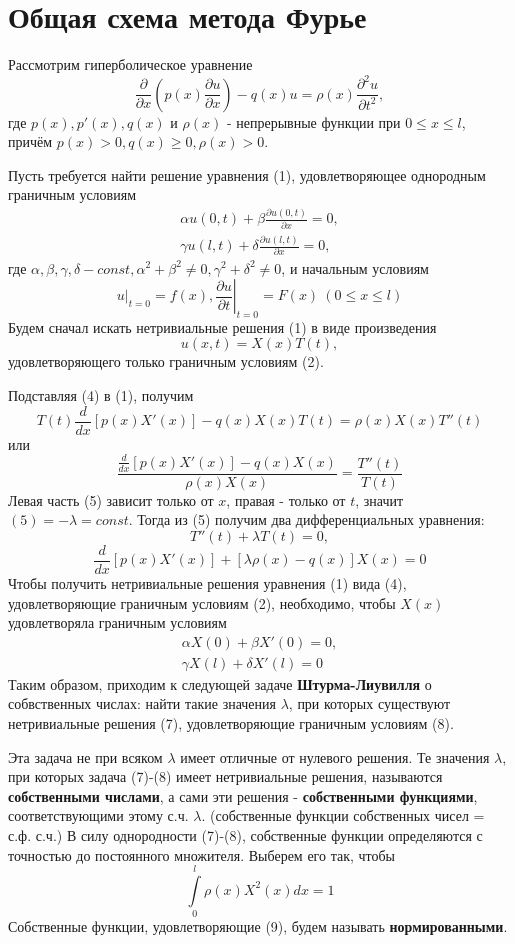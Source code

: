 \section{Общая схема метода Фурье}
Рассмотрим гиперболическое уравнение
\[
	\frac{\partial}{\partial x} \left( p(x) \frac{\partial u}{\partial x}\right) - q(x) u = \rho(x) \frac{\partial^2 u}{\partial t^2}, \tag{1}
\]
где $p(x), p'(x), q(x)$ и $\rho(x)$ - непрерывные функции при $0 \le x \le l$, причём $p(x) > 0, q(x) \ge 0, \rho(x) > 0$.

Пусть требуется найти решение уравнения (1), удовлетворяющее однородным граничным условиям
\[
	\begin{aligned}
		\alpha u(0,t) + \beta \frac{\partial u(0,t)}{\partial x} = 0, \\
		\gamma u(l,t) + \delta \frac{\partial u(l,t)}{\partial x} = 0,
	\end{aligned}
	\tag{2}
\]
где $\alpha, \beta, \gamma, \delta - const, \alpha^2 + \beta^2 \ne 0, \gamma^2 + \delta^2 \ne 0$, и начальным условиям
\[
	\left. u \right|_{t=0} = f(x), \left. \frac{\partial u}{\partial t}\right|_{t=0} = F(x) ~ (0 \le x \le l) \tag{3}
\]
Будем сначал искать нетривиальные решения (1) в виде произведения
\[
	u(x, t) = X(x) T(t), \tag{4}
\]
удовлетворяющего только граничным условиям (2).

Подставляя (4) в (1), получим
\[
	T(t) \frac{d}{dx} \left[ p(x) X'(x)\right] - q(x) X(x) T(t) = \rho(x) X(x) T''(t)
\]
или
\[
	\frac{\frac{d}{dx} \left[ p(x) X'(x)\right] - q(x) X(x)}{\rho(x) X(x)} = \frac{T''(t)}{T(t)} \tag{5}
\]
Левая часть (5) зависит только от $x$, правая - только от $t$, значит $(5) = -\lambda = const$. Тогда из (5) получим два дифференциальных уравнения:
\[
	T''(t) + \lambda T(t) = 0, \tag{6}
\]
\[
	\frac{d}{dx} \left[ p(x) X'(x) \right] + \left[ \lambda \rho(x) - q(x) \right] X(x) = 0 \tag{7}
\]
Чтобы получить нетривиальные решения уравнения (1) вида (4), удовлетворяющие граничным условиям (2), необходимо, чтобы $X(x)$ удовлетворяла граничным условиям
\[
	\begin{aligned}
		\alpha X(0) + \beta X'(0) = 0, \\
		\gamma X(l) + \delta X'(l) = 0 
	\end{aligned} \tag{8}
\]
Таким образом, приходим к следующей задаче \textbf{Штурма-Лиувилля} о собвственных числах: найти такие значения $\lambda$, при которых существуют нетривиальные решения (7), удовлетворяющие граничным условиям (8).

Эта задача не при всяком $\lambda$ имеет отличные от нулевого решения. Те значения $\lambda$, при которых задача (7)-(8) имеет нетривиальные решения, называются \textbf{собственными числами}, а сами эти решения - \textbf{собственными функциями}, соответствующими этому с.ч. $\lambda$. (собственные функции собственных чисел = с.ф. с.ч.) В силу однородности (7)-(8), собственные функции определяются с точностью до постоянного множителя. Выберем его так, чтобы
\[
	\int\limits_0^l \rho(x) X^2(x) dx = 1 \tag{9}
\]
Собственные функции, удовлетворяющие (9), будем называть \textbf{нормированными}.

